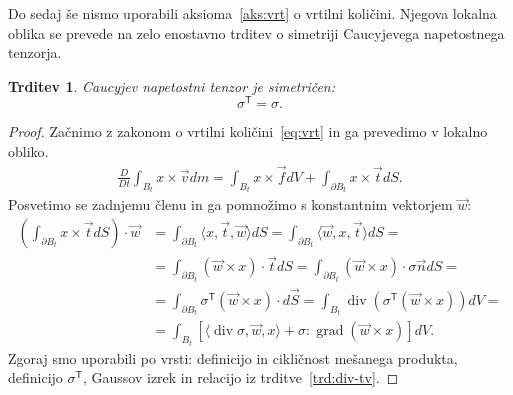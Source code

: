 \documentclass[12pt,a4paper,twoside]{article}
\theoremstyle{definition} %
\theoremstyle{plain} %
\newtheorem{trditev}[definicija]{Trditev}
\numberwithin{equation}{section}
\newcommand{\T}{\mathsf{T}}
\renewcommand{\div}{\operatorname{div}}
\newcommand{\grad}{\operatorname{grad}}
\newcommand{\DD}[2]{\ensuremath{\frac{D #1}{D #2}}}
\newcommand{\DDt}[1]{\DD{#1}{t}}
\newcommand{\vv}{\vec{v}}
\newcommand{\vt}{\vec{t}}
\newcommand{\vw}{\vec{w}}
\newcommand{\vn}{\vec{n}}
\newcommand{\vf}{\vec{f}}
\newcommand{\vx}{x}
\newcommand{\ts}{\sigma}
\begin{document}
Do sedaj še nismo uporabili aksioma~\ref{aks:vrt} o vrtilni količini.
Njegova lokalna oblika se prevede na zelo enostavno trditev o simetriji
Caucyjevega napetostnega tenzorja.
\begin{trditev}
  \label{trd:sigma-symmetric}
  Caucyjev napetostni tenzor je simetričen:
  \[ \ts^\T = \ts. \]
\end{trditev}
\begin{proof}
Začnimo z zakonom o vrtilni količini~\eqref{eq:vrt} in ga prevedimo v lokalno
obliko.
\begin{align*}
  \DDt{}\int_{B_t}\vx \times \vv dm = \int_{B_t} \vx \times \vf dV +
  \int_{\partial B_t} \vx\times\vt dS.
\end{align*}
Posvetimo se zadnjemu členu in ga pomnožimo s konstantnim vektorjem $\vw$:
\begin{align*}
\left(\int_{\partial B_t} \vx \times \vt dS\right)\cdot \vw  &=
  \int_{\partial B_t} \langle \vx, \vt, \vw \rangle dS =
  \int_{\partial B_t} \langle \vw, \vx, \vt \rangle dS = \\ &=
  \int_{\partial B_t} (\vw \times \vx) \cdot \vt dS =
  \int_{\partial B_t} (\vw \times \vx) \cdot \ts\vn dS = \\ &=
  \int_{\partial B_t} \ts^\T(\vw \times \vx) \cdot d\vec{S} =
  \int_{B_t} \div (\ts^\T(\vw \times \vx)) dV = \\ &=
\int_{B_t} [\langle \div \ts, \vw, \vx\rangle +  \ts : \grad (\vw \times \vx)] dV.
\end{align*}
Zgoraj smo uporabili po vrsti: definicijo in cikličnost mešanega produkta, definicijo
$\ts^\T$, Gaussov izrek in relacijo iz trditve~\ref{trd:div-tv}.


\end{proof}
\end{document}
